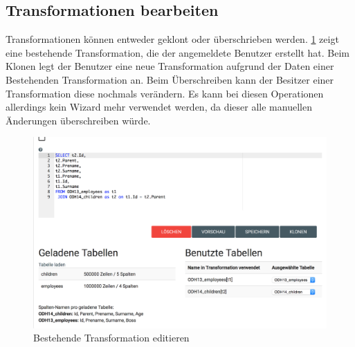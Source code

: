 \subsection{Transformationen bearbeiten}
Transformationen können entweder geklont oder überschrieben werden. \cref{fig:pd:transformation-edit} zeigt eine bestehende Transformation, die der angemeldete Benutzer erstellt hat. Beim Klonen legt der Benutzer eine neue Transformation aufgrund der Daten einer Bestehenden Transformation an. Beim Überschreiben kann der Besitzer einer Transformation diese nochmals verändern. Es kann bei diesen Operationen allerdings kein Wizard mehr verwendet werden, da dieser alle manuellen Änderungen überschreiben würde.
\begin{figure}[H]
\centering
\includegraphics[width=\linewidth]{fig/transformation-edit.png}
\caption{Bestehende Transformation editieren}
\label{fig:pd:transformation-edit}
\end{figure}